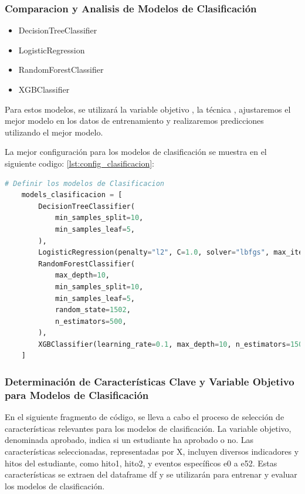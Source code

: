 \subsubsection{Comparacion y Analisis de Modelos de Clasificación}

\begin{itemize}
    \item DecisionTreeClassifier
    \item LogisticRegression
    \item RandomForestClassifier
    \item XGBClassifier
\end{itemize}

Para estos modelos, se utilizará la variable objetivo , la técnica , ajustaremos el mejor modelo en los datos de entrenamiento y realizaremos predicciones utilizando el mejor modelo.

La mejor configuración para los modelos de clasificación se muestra en el siguiente codigo: \ref{lst:config_clasificacion}:


\begin{lstlisting}[language=Python, caption=Definicion de los Modelos de Clasificación,label=lst:config_clasificacion]
    # Definir los modelos de Clasificacion
    models_clasificacion = [
        DecisionTreeClassifier(
            min_samples_split=10,
            min_samples_leaf=5,
        ),
        LogisticRegression(penalty="l2", C=1.0, solver="lbfgs", max_iter=150),
        RandomForestClassifier(
            max_depth=10,
            min_samples_split=10,
            min_samples_leaf=5,
            random_state=1502,
            n_estimators=500,
        ),
        XGBClassifier(learning_rate=0.1, max_depth=10, n_estimators=150, subsample=1.0),
    ]
\end{lstlisting}


\subsubsection{Determinación de Características Clave y Variable Objetivo para Modelos de Clasificación}

En el siguiente fragmento de código, se lleva a cabo el proceso de selección de características relevantes para los modelos de clasificación. La variable objetivo, denominada aprobado, indica si un estudiante ha aprobado o no. Las características seleccionadas, representadas por X, incluyen diversos indicadores y hitos del estudiante, como hito1, hito2, y eventos específicos e0 a e52. Estas características se extraen del dataframe df y se utilizarán para entrenar y evaluar los modelos de clasificación.

